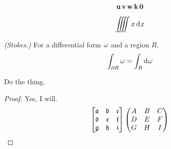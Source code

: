 \documentclass[11pt]{article}
\begin{document}
\[ \mathbf{u}\,\mathbf{v}\,\mathbf{w}\,\mathbf{k}\,\mathbf{0} \]

\[ \iiiint x \D x\]

\begin{thm*} {\em (Stokes.)}
    For a differential form $\omega$ and a region $R$, 
    \[ \int_{\del R}\om = \int_R \D \om \]
\end{thm*}


\begin{psetProblem}
    Do the thing.
    \begin{proof}
        Yes, I will.
        \[ 
            \bthree{\La}{\Lb}{\Lc}{\Ld}{\Le}{\Lf}{\Lg}{\Lh}{\Li}
            \pthree{\CA}{\CB}{\CC}{\CD}{\CE}{\CF}{\CG}{\CH}{\CI} 
        \]
    \end{proof}
\end{psetProblem}
\end{document}
